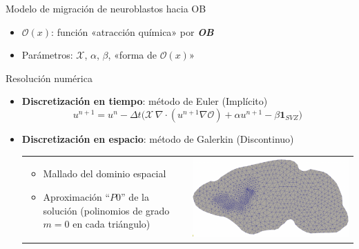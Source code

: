 \documentclass[
  unknownkeysallowed %
]{beamer}
\begin{document}
\begin{frame}{Modelo de migración de neuroblastos hacia OB}
\begin{overprint}
  \end{overprint}
  \bigskip
  \begin{itemize}\itemsep0.2em
  \item<2-> $\mathcal{O}(x)$: función «atracción química» por {\color{OBcolor}\textbf{\textit{OB}}}
  \item<3-> Parámetros: $ \mathcal{X}$, $\alpha$, $\beta$, «forma de $\mathcal{O}(x)$»
  \end{itemize}
\end{frame}

\begin{frame}{Resolución numérica}
  \begin{itemize}
    \item \textbf{Discretización en \alert{tiempo}}: método de Euler (Implícito)
    $$
    u^{n+1} = u^n - \Delta t \big( \mathcal{X}\,\nabla\cdot(u^{n+1} \nabla\mathcal{O})
    + \alpha u^{n+1} -\beta \mathbf{1}_{SVZ} \big)
    $$
  \item \textbf{Discretización en \alert{espacio}}: método de Galerkin (Discontinuo)
    \begin{tabular*}{\linewidth}{ll}
      \begin{minipage}{0.6\linewidth}
        \begin{itemize}
        \item Mallado del dominio espacial
        \item Aproximación ``$P0$'' de la solución (polinomios de grado $m=0$ en cada triángulo)
        \end{itemize}
      \end{minipage}
      &
        \includegraphics[width=0.3\linewidth]{img/brain_mesh}
    \end{tabular*}
  \end{itemize}
\end{frame}

\end{document}
